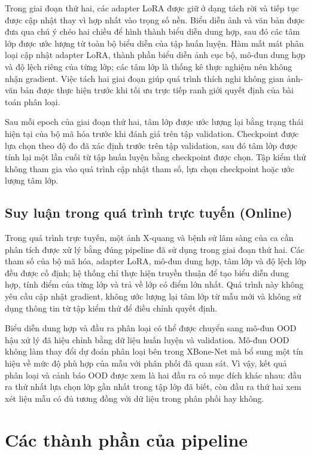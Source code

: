 Trong giai đoạn thứ hai, các adapter LoRA được giữ ở dạng tách rời và tiếp tục được cập nhật thay vì hợp nhất vào trọng số nền. Biểu diễn ảnh và văn bản được đưa qua chú ý chéo hai chiều để hình thành biểu diễn dung hợp, sau đó các tâm lớp được ước lượng từ toàn bộ biểu diễn của tập huấn luyện. Hàm mất mát phân loại cập nhật adapter LoRA, thành phần biểu diễn ảnh cục bộ, mô-đun dung hợp và độ lệch riêng của từng lớp; các tâm lớp là thống kê thực nghiệm nên không nhận gradient. Việc tách hai giai đoạn giúp quá trình thích nghi không gian ảnh-văn bản được thực hiện trước khi tối ưu trực tiếp ranh giới quyết định của bài toán phân loại.

Sau mỗi epoch của giai đoạn thứ hai, tâm lớp được ước lượng lại bằng trạng thái hiện tại của bộ mã hóa trước khi đánh giá trên tập validation. Checkpoint được lựa chọn theo độ đo đã xác định trước trên tập validation, sau đó tâm lớp được tính lại một lần cuối từ tập huấn luyện bằng checkpoint được chọn. Tập kiểm thử không tham gia vào quá trình cập nhật tham số, lựa chọn checkpoint hoặc ước lượng tâm lớp.

\subsection{Suy luận trong quá trình trực tuyến (Online)}

Trong quá trình trực tuyến, một ảnh X-quang và bệnh sử lâm sàng của ca cần phân tích được xử lý bằng đúng pipeline đã sử dụng trong giai đoạn thứ hai. Các tham số của bộ mã hóa, adapter LoRA, mô-đun dung hợp, tâm lớp và độ lệch lớp đều được cố định; hệ thống chỉ thực hiện truyền thuận để tạo biểu diễn dung hợp, tính điểm của từng lớp và trả về lớp có điểm lớn nhất. Quá trình này không yêu cầu cập nhật gradient, không ước lượng lại tâm lớp từ mẫu mới và không sử dụng thông tin từ tập kiểm thử để điều chỉnh quyết định.

Biểu diễn dung hợp và đầu ra phân loại có thể được chuyển sang mô-đun OOD hậu xử lý đã hiệu chỉnh bằng dữ liệu huấn luyện và validation. Mô-đun OOD không làm thay đổi dự đoán phân loại bên trong XBone-Net mà bổ sung một tín hiệu về mức độ phù hợp của mẫu với phân phối đã quan sát. Vì vậy, kết quả phân loại và cảnh báo OOD được xem là hai đầu ra có mục đích khác nhau: đầu ra thứ nhất lựa chọn lớp gần nhất trong tập lớp đã biết, còn đầu ra thứ hai xem xét liệu mẫu có đủ tương đồng với dữ liệu trong phân phối hay không.

\section{Các thành phần của pipeline}


